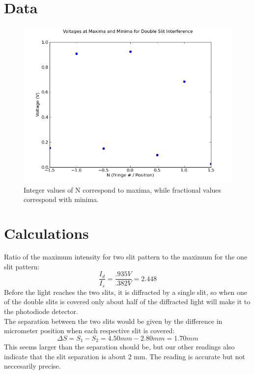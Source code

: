 \documentclass[12pt]{article}
\begin{document}
\section{Data}

\begin{figure}[H]
\centering
\hspace{-0.0in}\includegraphics[scale=0.60]{Plot1.png}
\caption{Integer values of N correspond to maxima, while fractional values correspond with minima. \label{fig:setup}}
\end{figure}


\section{Calculations}
\indent \indent Ratio of the maximum intensity for two slit pattern to the maximum for the one slit pattern:
\[ \frac{I_d}{I_s} = \frac {.935 V}{.382 V} = 2.448 \]
\indent \indent Before the light reaches the two slits, it is diffracted by a single slit, so when one of the double slits is covered only about half of the diffracted light will make it to the photodiode detector. \\

\indent \indent The separation between the two slits would be given by the difference in micrometer position when each respective slit is covered:
\[ \Delta S = S_1 - S_2 = 4.50 mm - 2.80 mm = 1.70 mm \]
\indent \indent This seems larger than the separation should be, but our other readings also indicate that the slit separation is about 2 mm. The reading is accurate but not neccesarily precise.
\end{document}
